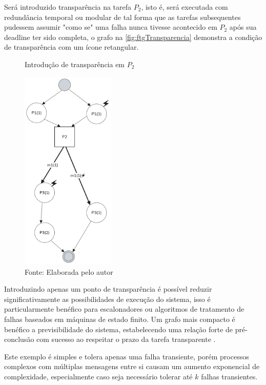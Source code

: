 Será introduzido transparência na tarefa $P_2$, isto é, será executada com redundância temporal ou modular de tal forma que as tarefas subsequentes pudessem assumir "como se" uma falha nunca tivesse acontecido em $P_2$ após sua deadline ter sido completa, o grafo na \autoref{fig:ftgTransparencia} demonstra a condição de transparência com um ícone retangular.

\begin{figure}[H]
    \centering
	\captionsetup{justification=centering}
    \caption{Introdução de transparência em $P_2$}
    \includegraphics[width=0.40\textwidth]{assets/ftg_transparencia.png}
	\captionsetup{justification=raggedright}
    \caption*{Fonte: Elaborada pelo autor}
    \label{fig:ftgTransparencia}
\end{figure}

Introduzindo apenas um ponto de transparência é possível reduzir significativamente as possibilidades de execução do sistema, isso é particularmente benéfico para escalonadores ou algoritmos de tratamento de falhas baseados em máquinas de estado finito. Um grafo mais compacto é benéfico a previsibilidade do sistema, estabelecendo uma relação forte de pré-conclusão com sucesso ao respeitar o prazo da tarefa transparente \cite{SchedAndOptOfDistributedFT}.

Este exemplo é simples e tolera apenas uma falha transiente, porém processos complexos com múltiplas mensagens entre si causam um aumento exponencial de complexidade, especialmente caso seja necessário tolerar até $k$ falhas transientes.


